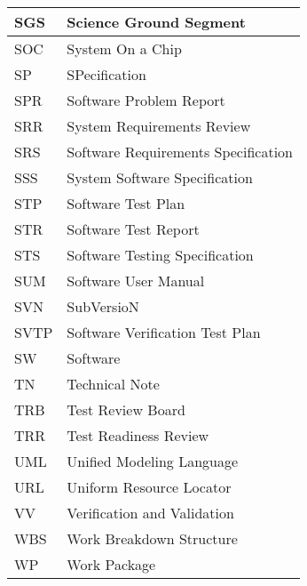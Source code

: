 \begin{longtable}{|l|p{}|}
SGS&Science Ground Segment \\\hline
SOC&System On a Chip \\\hline
SP&SPecification \\\hline
SPR&Software Problem Report \\\hline
SRR&System Requirements Review \\\hline
SRS&Software Requirements Specification \\\hline
SSS&System Software Specification \\\hline
STP&Software Test Plan \\\hline
STR&Software Test Report \\\hline
STS&Software Testing Specification \\\hline
SUM&Software User Manual \\\hline
SVN&SubVersioN \\\hline
SVTP&Software Verification Test Plan \\\hline
SW&Software \\\hline
TN&Technical Note \\\hline
TRB&Test Review Board \\\hline
TRR&Test Readiness Review \\\hline
UML&Unified Modeling Language \\\hline
URL&Uniform Resource Locator \\\hline
VV&Verification and Validation \\\hline
WBS&Work Breakdown Structure \\\hline
WP&Work Package \\\hline
\end{longtable} 
